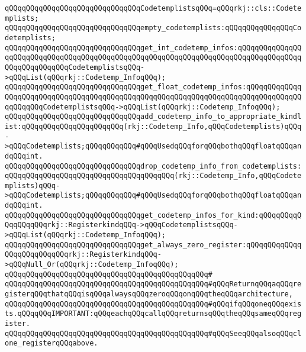 \verb|qQQqqQQqqQQqqQQqqQQqqQQqqQQqqQQqCodetemplistsqQQq=qQQqrkj::cls::Codetemplists;|\newline
\newline
\verb|qQQqqQQqqQQqqQQqqQQqqQQqqQQqqQQqempty_codetemplists:qQQqqQQqqQQqqQQqCodetemplists;|\newline
\newline
\verb|qQQqqQQqqQQqqQQqqQQqqQQqqQQqqQQqget_int_codetemp_infos:qQQqqQQqqQQqqQQqqQQqqQQqqQQqqQQqqQQqqQQqqQQqqQQqqQQqqQQqqQQqqQQqqQQqqQQqqQQqqQQqqQQqqQQqqQQqqQQqqQQqCodetemplistsqQQq->qQQqList(qQQqrkj::Codetemp_InfoqQQq);|\newline
\verb|qQQqqQQqqQQqqQQqqQQqqQQqqQQqqQQqget_float_codetemp_infos:qQQqqQQqqQQqqQQqqQQqqQQqqQQqqQQqqQQqqQQqqQQqqQQqqQQqqQQqqQQqqQQqqQQqqQQqqQQqqQQqqQQqqQQqqQQqCodetemplistsqQQq->qQQqList(qQQqrkj::Codetemp_InfoqQQq);|\newline
\newline
\verb|qQQqqQQqqQQqqQQqqQQqqQQqqQQqqQQqadd_codetemp_info_to_appropriate_kindlist:qQQqqQQqqQQqqQQqqQQqqQQq(rkj::Codetemp_Info,qQQqCodetemplists)qQQq->qQQqCodetemplists;qQQqqQQqqQQq#qQQqUsedqQQqforqQQqbothqQQqfloatqQQqandqQQqint.|\newline
\verb|qQQqqQQqqQQqqQQqqQQqqQQqqQQqqQQqdrop_codetemp_info_from_codetemplists:qQQqqQQqqQQqqQQqqQQqqQQqqQQqqQQqqQQqqQQq(rkj::Codetemp_Info,qQQqCodetemplists)qQQq->qQQqCodetemplists;qQQqqQQqqQQq#qQQqUsedqQQqforqQQqbothqQQqfloatqQQqandqQQqint.|\newline
\newline
\newline
\verb|qQQqqQQqqQQqqQQqqQQqqQQqqQQqqQQqget_codetemp_infos_for_kind:qQQqqQQqqQQqqQQqqQQqrkj::RegisterkindqQQq->qQQqCodetemplistsqQQq->qQQqList(qQQqrkj::Codetemp_InfoqQQq);|\newline
\newline
\verb|qQQqqQQqqQQqqQQqqQQqqQQqqQQqqQQqget_always_zero_register:qQQqqQQqqQQqqQQqqQQqqQQqqQQqrkj::RegisterkindqQQq->qQQqNull_Or(qQQqrkj::Codetemp_InfoqQQq);|\newline
\verb|qQQqqQQqqQQqqQQqqQQqqQQqqQQqqQQqqQQqqQQqqQQqqQQq#|\newline
\verb|qQQqqQQqqQQqqQQqqQQqqQQqqQQqqQQqqQQqqQQqqQQqqQQq#qQQqReturnqQQqaqQQqregisterqQQqthatqQQqisqQQqalwaysqQQqzeroqQQqonqQQqtheqQQqarchitecture,|\newline
\verb|qQQqqQQqqQQqqQQqqQQqqQQqqQQqqQQqqQQqqQQqqQQqqQQq#qQQqifqQQqoneqQQqexists.qQQqqQQqIMPORTANT:qQQqeachqQQqcallqQQqreturnsqQQqtheqQQqsameqQQqregister.|\newline
\verb|qQQqqQQqqQQqqQQqqQQqqQQqqQQqqQQqqQQqqQQqqQQqqQQq#qQQqSeeqQQqalsoqQQqclone_registerqQQqabove.|\newline

